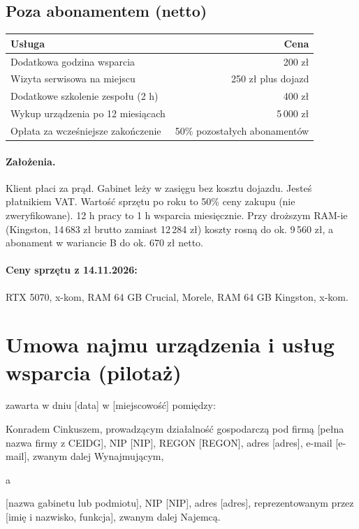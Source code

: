 \documentclass[11pt,a4paper]{article}
\begin{document}
\subsection*{Poza abonamentem (netto)}
\begin{tabularx}{\linewidth}{@{}Xr@{}}
\toprule
Usługa & Cena \\
\midrule
Dodatkowa godzina wsparcia & 200 zł \\
Wizyta serwisowa na miejscu & 250 zł plus dojazd \\
Dodatkowe szkolenie zespołu (2 h) & 400 zł \\
Wykup urządzenia po 12 miesiącach & 5\,000 zł \\
Opłata za wcześniejsze zakończenie & 50\% pozostałych abonamentów \\
\bottomrule
\end{tabularx}

\paragraph{Założenia.} Klient płaci za prąd. Gabinet leży w zasięgu bez kosztu dojazdu. Jesteś płatnikiem VAT. Wartość sprzętu po roku to 50\% ceny zakupu (nie zweryfikowane). 12 h pracy to 1 h wsparcia miesięcznie. Przy droższym RAM-ie (Kingston, 14\,683 zł brutto zamiast 12\,284 zł) koszty rosną do ok. 9\,560 zł, a abonament w wariancie B do ok. 670 zł netto.

\paragraph{Ceny sprzętu z 14.11.2026:} RTX 5070, x-kom, RAM 64 GB Crucial, Morele, RAM 64 GB Kingston, x-kom.

\clearpage
\section*{Umowa najmu urządzenia i usług wsparcia (pilotaż)}

zawarta w dniu [data] w [miejscowość] pomiędzy:

Konradem Cinkuszem, prowadzącym działalność gospodarczą pod firmą [pełna nazwa firmy z CEIDG], NIP [NIP], REGON [REGON], adres [adres], e-mail [e-mail], zwanym dalej Wynajmującym,

a

[nazwa gabinetu lub podmiotu], NIP [NIP], adres [adres], reprezentowanym przez [imię i nazwisko, funkcja], zwanym dalej Najemcą.
\end{document}
